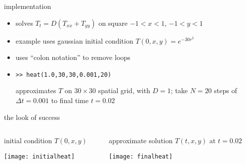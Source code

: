 \begin{frame}{implementation}
\label{slide:heatmatlab}


\small
\begin{itemize}
\item solves $T_t = D(T_{xx} + T_{yy})$ on square $-1 < x < 1$, $-1 < y < 1$
\item example uses gaussian initial condition $T(0,x,y) = e^{-30 r^2}$
\item uses ``colon notation'' to remove loops
\item \texttt{>>  heat(1.0,30,30,0.001,20)}

approximates $T$ on $30\times 30$ spatial grid, with $D=1$; take $N=20$ steps of $\Delta t = 0.001$ to final time $t = 0.02$
\end{itemize}
\end{frame}


\begin{frame}{the look of success}

\begin{columns}
\begin{column}{0.5\textwidth}
initial condition $T(0,x,y)$

\bigskip
\begin{center}
\texttt{[image: initialheat]}
\end{center}
\end{column}
\begin{column}{0.5\textwidth}
approximate solution $T(t,x,y)$ at $t=0.02$

\bigskip
\begin{center}
\texttt{[image: finalheat]}
\end{center}
\end{column}
\end{columns}
\end{frame}



